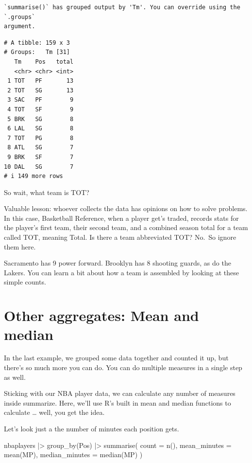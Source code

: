 \documentclass[
  letterpaper,
  DIV=11,
  numbers=noendperiod]{scrreprt}
\newenvironment{Shaded}{\begin{snugshade}}{\end{snugshade}}
\newcommand{\AttributeTok}[1]{\textcolor[rgb]{0.40,0.45,0.13}{#1}}
\newcommand{\FunctionTok}[1]{\textcolor[rgb]{0.28,0.35,0.67}{#1}}
\newcommand{\NormalTok}[1]{\textcolor[rgb]{0.00,0.23,0.31}{#1}}
\newcommand{\SpecialCharTok}[1]{\textcolor[rgb]{0.37,0.37,0.37}{#1}}
\begin{document}
\begin{verbatim}
`summarise()` has grouped output by 'Tm'. You can override using the `.groups`
argument.
\end{verbatim}

\begin{verbatim}
# A tibble: 159 x 3
# Groups:   Tm [31]
   Tm    Pos   total
   <chr> <chr> <int>
 1 TOT   PF       13
 2 TOT   SG       13
 3 SAC   PF        9
 4 TOT   SF        9
 5 BRK   SG        8
 6 LAL   SG        8
 7 TOT   PG        8
 8 ATL   SG        7
 9 BRK   SF        7
10 DAL   SG        7
# i 149 more rows
\end{verbatim}

So wait, what team is TOT?

Valuable lesson: whoever collects the data has opinions on how to solve
problems. In this case, Basketball Reference, when a player get's
traded, records stats for the player's first team, their second team,
and a combined season total for a team called TOT, meaning Total. Is
there a team abbreviated TOT? No.~So ignore them here.

Sacramento has 9 power forward. Brooklyn has 8 shooting guards, as do
the Lakers. You can learn a bit about how a team is assembled by looking
at these simple counts.

\hypertarget{other-aggregates-mean-and-median}{%
\section{Other aggregates: Mean and
median}\label{other-aggregates-mean-and-median}}

In the last example, we grouped some data together and counted it up,
but there's so much more you can do. You can do multiple measures in a
single step as well.

Sticking with our NBA player data, we can calculate any number of
measures inside summarize. Here, we'll use R's built in mean and median
functions to calculate \ldots{} well, you get the idea.

Let's look just a the number of minutes each position gets.

\begin{Shaded}
\begin{Highlighting}[]
\NormalTok{nbaplayers }\SpecialCharTok{|\textgreater{}}
  \FunctionTok{group\_by}\NormalTok{(Pos) }\SpecialCharTok{|\textgreater{}}
  \FunctionTok{summarise}\NormalTok{(}
    \AttributeTok{count =} \FunctionTok{n}\NormalTok{(),}
    \AttributeTok{mean\_minutes =} \FunctionTok{mean}\NormalTok{(MP),}
    \AttributeTok{median\_minutes =} \FunctionTok{median}\NormalTok{(MP)}
\NormalTok{  )}
\end{Highlighting}
\end{Shaded}
\end{document}
